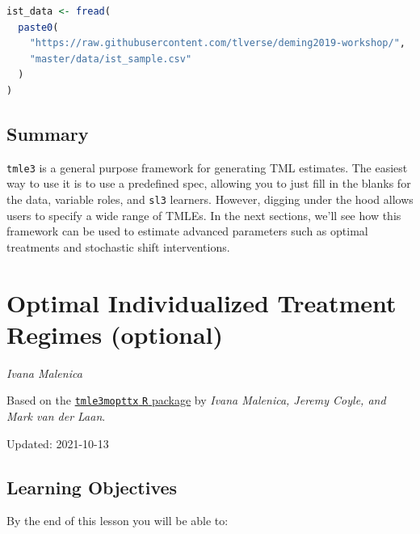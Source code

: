 \documentclass[
  12pt, krantz2,
]{book}
\newcommand{\passthrough}[1]{#1}
\theoremstyle{definition}
\theoremstyle{definition}
\theoremstyle{definition}
\newcommand{\1}{\mathbbm{1}}
\begin{document}
\begin{lstlisting}[language=R]
ist_data <- fread(
  paste0(
    "https://raw.githubusercontent.com/tlverse/deming2019-workshop/",
    "master/data/ist_sample.csv"
  )
)
\end{lstlisting}

\hypertarget{summary}{%
\section{Summary}\label{summary}}

\passthrough{\lstinline!tmle3!} is a general purpose framework for generating TML estimates. The easiest
way to use it is to use a predefined spec, allowing you to just fill in the
blanks for the data, variable roles, and \passthrough{\lstinline!sl3!} learners. However, digging under
the hood allows users to specify a wide range of TMLEs. In the next sections,
we'll see how this framework can be used to estimate advanced parameters such as
optimal treatments and stochastic shift interventions.

\hypertarget{optimal-individualized-treatment-regimes-optional}{%
\chapter{Optimal Individualized Treatment Regimes (optional)}\label{optimal-individualized-treatment-regimes-optional}}

\emph{Ivana Malenica}

Based on the \href{https://github.com/tlverse/tmle3mopttx}{\passthrough{\lstinline!tmle3mopttx!} \passthrough{\lstinline!R!} package}
by \emph{Ivana Malenica, Jeremy Coyle, and Mark van der Laan}.

Updated: 2021-10-13

\hypertarget{learning-objectives-3}{%
\section{Learning Objectives}\label{learning-objectives-3}}

By the end of this lesson you will be able to:
\end{document}
